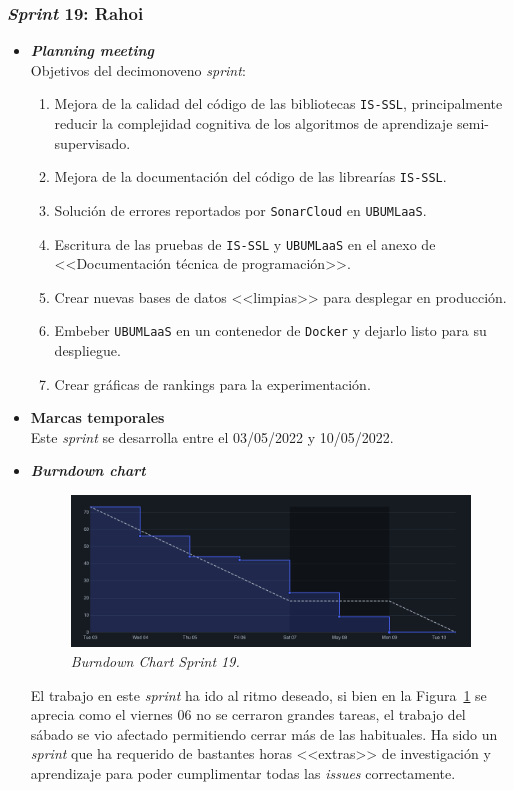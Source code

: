 \subsubsection{\textit{Sprint} 19: Rahoi}
\begin{itemize}
\item \textbf{\textit{Planning meeting}}\\
Objetivos del decimonoveno \textit{sprint}:
\begin{enumerate}
\item Mejora de la calidad del código de las bibliotecas \texttt{IS-SSL}, principalmente reducir la complejidad cognitiva de los algoritmos de aprendizaje semi-supervisado.
\item Mejora de la documentación del código de las librearías \texttt{IS-SSL}.
\item Solución de errores reportados por \texttt{SonarCloud} en \texttt{UBUMLaaS}.
\item Escritura de las pruebas de \texttt{IS-SSL} y \texttt{UBUMLaaS} en el anexo de <<Documentación técnica de programación>>.
\item Crear nuevas bases de datos <<limpias>> para desplegar en producción.
\item Embeber \texttt{UBUMLaaS} en un contenedor de \texttt{Docker} y dejarlo listo para su despliegue.
\item Crear gráficas de rankings para la experimentación.
\end{enumerate}

\item \textbf{Marcas temporales}\\
Este \textit{sprint} se desarrolla entre el 03/05/2022 y 10/05/2022.

\item \textbf{\textit{Burndown chart}}\\
\begin{figure}
\begin{center}
\includegraphics[width=\textwidth]{../img/anexos/sprints/BD-Sprint19}
\caption{\textit{Burndown Chart Sprint 19.}}\label{fig:BD-Sprint19}
\end{center}
\end{figure}
El trabajo en este \textit{sprint} ha ido al ritmo deseado, si bien en la Figura~\ref{fig:BD-Sprint19} se aprecia como el viernes 06 no se cerraron grandes tareas, el trabajo del sábado se vio afectado permitiendo cerrar más de las habituales. Ha sido un \textit{sprint} que ha requerido de bastantes horas <<extras>> de investigación y aprendizaje para poder cumplimentar todas las \textit{issues} correctamente.


\end{itemize}
